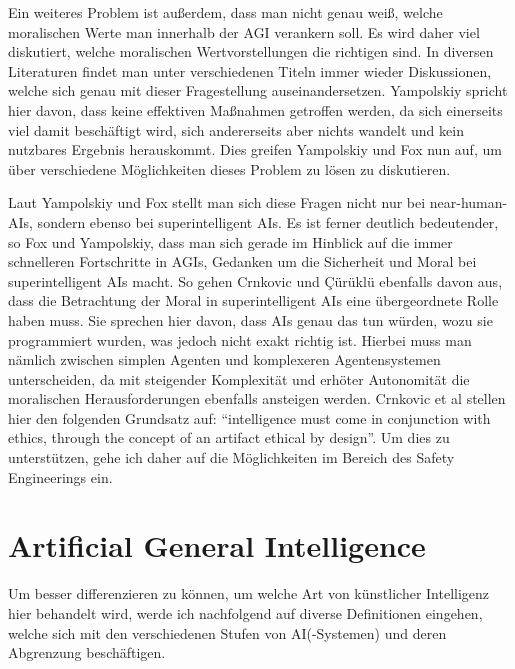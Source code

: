             Ein weiteres Problem ist außerdem, dass man nicht genau weiß, welche moralischen Werte man
            innerhalb der AGI verankern soll.\cite[p. 1]{yampolskiy2013safety} Es wird daher viel
            diskutiert, welche moralischen Wertvorstellungen die richtigen sind. In diversen Literaturen
            findet man unter verschiedenen Titeln immer wieder Diskussionen, welche sich genau mit dieser
            Fragestellung auseinandersetzen. Yampolskiy spricht hier davon, dass keine effektiven
            Maßnahmen getroffen werden, da sich einerseits viel damit beschäftigt wird, sich andererseits
            aber nichts wandelt und kein nutzbares Ergebnis herauskommt.\cite[p. 1]{yampolskiy2013safety}
            Dies greifen Yampolskiy und Fox nun auf, um über verschiedene Möglichkeiten dieses Problem zu
            lösen zu diskutieren.

            Laut Yampolskiy und Fox stellt man sich diese Fragen nicht nur bei near-human-AIs, sondern
            ebenso bei superintelligent AIs.\cite[p. 2]{yampolskiy2013safety} Es ist ferner deutlich
            bedeutender, so Fox und Yampolskiy, dass man sich gerade im Hinblick auf die immer schnelleren
            Fortschritte in AGIs, Gedanken um die Sicherheit und Moral bei superintelligent AIs macht.
            So gehen Crnkovic und {\c{C}}{\"u}r{\"u}kl{\"u} ebenfalls davon aus, dass die Betrachtung
            der Moral in superintelligent AIs eine übergeordnete Rolle haben muss.\cite[p. 1]{crnkovic2012robots}
            Sie sprechen hier davon, dass AIs genau das tun würden, wozu sie programmiert
            wurden, was jedoch nicht exakt richtig ist. Hierbei muss man nämlich zwischen simplen Agenten
            und komplexeren Agentensystemen unterscheiden, da mit steigender Komplexität und erhöter
            Autonomität die moralischen Herausforderungen ebenfalls ansteigen werden. Crnkovic et al
            stellen hier den folgenden Grundsatz auf: ``intelligence must come in conjunction with ethics,
            through the concept of an artifact ethical by design''. Um dies zu unterstützen, gehe ich daher
            auf die Möglichkeiten im Bereich des Safety Engineerings ein.

    \section{Artificial General Intelligence}
        Um besser differenzieren zu können, um welche Art von künstlicher Intelligenz hier behandelt
        wird, werde ich nachfolgend auf diverse Definitionen eingehen, welche sich mit den verschiedenen
        Stufen von AI(-Systemen) und deren Abgrenzung beschäftigen.

